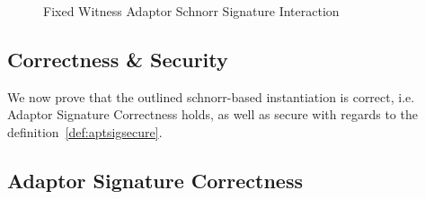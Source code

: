 \begin{figure}
    \caption{Fixed Witness Adaptor Schnorr Signature Interaction}
    \label{fig:aptSchnorrInteraction}
\end{figure}

\subsection{Correctness \& Security}\label{sec:twopartyAptSecurity}

We now prove that the outlined schnorr-based instantiation is correct, i.e. Adaptor Signature Correctness holds, as well as secure with regards to the definition~\ref{def:aptsigsecure}.

\subsection{Adaptor Signature Correctness}\label{subsec:cnstaptsigcorrectness}

